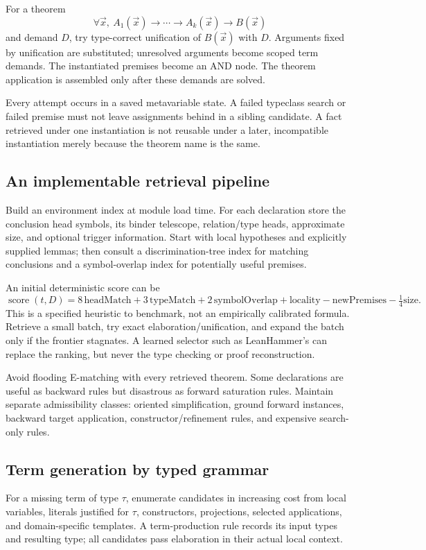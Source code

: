 \documentclass[11pt,letterpaper]{article}
\theoremstyle{definition}\newtheorem{definition}[proposition]{Definition}
\begin{document}
For a theorem
\[
\forall\vec x,\ A_1(\vec x)\to\cdots\to A_k(\vec x)\to B(\vec x)
\]
and demand $D$, try type-correct unification of $B(\vec x)$ with $D$. Arguments fixed by unification are substituted; unresolved arguments become scoped term demands. The instantiated premises become an AND node. The theorem application is assembled only after these demands are solved.

Every attempt occurs in a saved metavariable state. A failed typeclass search or failed premise must not leave assignments behind in a sibling candidate. A fact retrieved under one instantiation is not reusable under a later, incompatible instantiation merely because the theorem name is the same.

\subsection{An implementable retrieval pipeline}
Build an environment index at module load time. For each declaration store the conclusion head symbols, its binder telescope, relation/type heads, approximate size, and optional trigger information. Start with local hypotheses and explicitly supplied lemmas; then consult a discrimination-tree index for matching conclusions and a symbol-overlap index for potentially useful premises.

An initial deterministic score can be
\[
\operatorname{score}(t,D)=
8\,\mathrm{headMatch}+3\,\mathrm{typeMatch}
+2\,\mathrm{symbolOverlap}+\mathrm{locality}
-\mathrm{newPremises}-\tfrac14\mathrm{size}.
\]
This is a specified heuristic to benchmark, not an empirically calibrated formula. Retrieve a small batch, try exact elaboration/unification, and expand the batch only if the frontier stagnates. A learned selector such as LeanHammer's can replace the ranking, but never the type checking or proof reconstruction.~\cite{leanhammer}

Avoid flooding E-matching with every retrieved theorem. Some declarations are useful as backward rules but disastrous as forward saturation rules. Maintain separate admissibility classes: oriented simplification, ground forward instances, backward target application, constructor/refinement rules, and expensive search-only rules.

\subsection{Term generation by typed grammar}
For a missing term of type $\tau$, enumerate candidates in increasing cost from local variables, literals justified for $\tau$, constructors, projections, selected applications, and domain-specific templates. A term-production rule records its input types and resulting type; all candidates pass elaboration in their actual local context.
\end{document}

